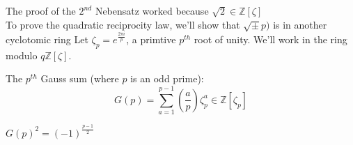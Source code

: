 \documentclass[11pt]{article}
\begin{document}
The proof of the $2^{nd}$ Nebensatz worked because $\sqrt{2} \in \mathbb{Z}[\zeta]$\\
To prove the quadratic reciprocity law, we'll show that $\sqrt\pm p)$ is in another cyclotomic ring
\newpage
	Let $\zeta_p = e^{\frac{2\pi i }{p}} $, a primtive $p^{th}$ root of unity. We'll work in the ring modulo $q\mathbb{Z}[\zeta]$.

	\begin{definition}
		The $p^{th}$ Gauss sum (where $p$ is an odd prime):\large
		\begin{equation*}
			G(p) = \sum_{a=1}^{p-1}(\frac{a}{p})\zeta^a_p \in \mathbb{Z}[\zeta_p]
		\end{equation*}

	\end{definition}
		\normalsize
		\begin{lemma}
			$G(p)^2 = (-1)^{\frac{p-1}{2}}$ 
		\end{lemma}
\end{document}
